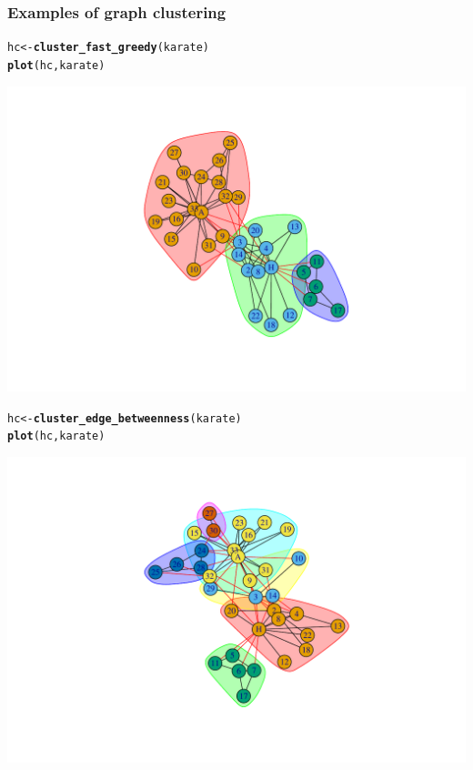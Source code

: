 \documentclass{beamer}\usepackage[]{graphicx}\usepackage[]{color}
\makeatletter
\newcommand{\hlstd}[1]{\textcolor[rgb]{0.345,0.345,0.345}{#1}}%
\newcommand{\hlkwb}[1]{\textcolor[rgb]{0.69,0.353,0.396}{#1}}%
\newcommand{\hlkwd}[1]{\textcolor[rgb]{0.737,0.353,0.396}{\textbf{#1}}}%
\newenvironment{kframe}{%
 \def\at@end@of@kframe{}%
 \ifinner\ifhmode%
  \def\at@end@of@kframe{\end{minipage}}%
  \begin{minipage}{\columnwidth}%
 \fi\fi%
 \def\FrameCommand##1{\hskip\@totalleftmargin \hskip-\fboxsep
 \colorbox{shadecolor}{##1}\hskip-\fboxsep
     \hskip-\linewidth \hskip-\@totalleftmargin \hskip\columnwidth}%
 \MakeFramed {\advance\hsize-\width
   \@totalleftmargin\z@ \linewidth\hsize
   \@setminipage}}%
 {\par\unskip\endMakeFramed%
 \at@end@of@kframe}
\newenvironment{knitrout}{}{} %
\makeatother
\begin{document}
\begin{frame}
  \frametitle{Examples of graph clustering}

\begin{knitrout}\scriptsize
{}\color{fgcolor}\begin{kframe}
\begin{alltt}
\hlstd{hc} \hlkwb{<-} \hlkwd{cluster_fast_greedy}\hlstd{(karate)}
\hlkwd{plot}\hlstd{(hc,karate)}
\end{alltt}
\end{kframe}
\includegraphics[width=.8\textwidth]{figures/unnamed-chunk-3-1} 

\end{knitrout}

\begin{knitrout}\scriptsize
{}\color{fgcolor}\begin{kframe}
\begin{alltt}
\hlstd{hc} \hlkwb{<-} \hlkwd{cluster_edge_betweenness}\hlstd{(karate)}
\hlkwd{plot}\hlstd{(hc,karate)}
\end{alltt}
\end{kframe}
\includegraphics[width=.8\textwidth]{figures/unnamed-chunk-4-1} 


\end{knitrout}
\end{frame}
\end{document}
